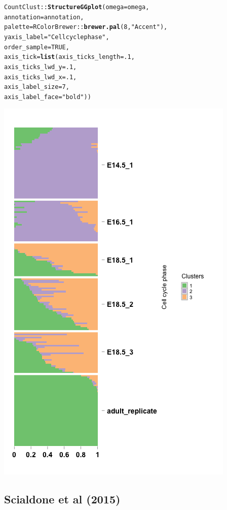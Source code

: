 \documentclass[12pt]{article}\usepackage[]{graphicx}\usepackage[usenames,dvipsnames]{color}
\makeatletter
\newcommand{\hlnum}[1]{\textcolor[rgb]{0.686,0.059,0.569}{#1}}%
\newcommand{\hlstr}[1]{\textcolor[rgb]{0.192,0.494,0.8}{#1}}%
\newcommand{\hlopt}[1]{\textcolor[rgb]{0,0,0}{#1}}%
\newcommand{\hlstd}[1]{\textcolor[rgb]{0.345,0.345,0.345}{#1}}%
\newcommand{\hlkwc}[1]{\textcolor[rgb]{0.333,0.667,0.333}{#1}}%
\newcommand{\hlkwd}[1]{\textcolor[rgb]{0.737,0.353,0.396}{\textbf{#1}}}%
\newenvironment{kframe}{%
 \def\at@end@of@kframe{}%
 \ifinner\ifhmode%
  \def\at@end@of@kframe{\end{minipage}}%
  \begin{minipage}{\columnwidth}%
 \fi\fi%
 \def\FrameCommand##1{\hskip\@totalleftmargin \hskip-\fboxsep
 \colorbox{shadecolor}{##1}\hskip-\fboxsep
     \hskip-\linewidth \hskip-\@totalleftmargin \hskip\columnwidth}%
 \MakeFramed {\advance\hsize-\width
   \@totalleftmargin\z@ \linewidth\hsize
   \@setminipage}}%
 {\par\unskip\endMakeFramed%
 \at@end@of@kframe}
\newenvironment{knitrout}{}{} %
\makeatother
\begin{document}
\begin{knitrout}
\begin{kframe}
\begin{alltt}
\hlstd{CountClust}\hlopt{::}\hlkwd{StructureGGplot}\hlstd{(}\hlkwc{omega} \hlstd{= omega,}
                \hlkwc{annotation} \hlstd{= annotation,}
                \hlkwc{palette} \hlstd{= RColorBrewer}\hlopt{::}\hlkwd{brewer.pal}\hlstd{(}\hlnum{8}\hlstd{,} \hlstr{"Accent"}\hlstd{),}
                \hlkwc{yaxis_label} \hlstd{=} \hlstr{"Cell cycle phase"}\hlstd{,}
                \hlkwc{order_sample} \hlstd{=} \hlnum{TRUE}\hlstd{,}
                \hlkwc{axis_tick} \hlstd{=} \hlkwd{list}\hlstd{(}\hlkwc{axis_ticks_length} \hlstd{=} \hlnum{.1}\hlstd{,}
                                 \hlkwc{axis_ticks_lwd_y} \hlstd{=} \hlnum{.1}\hlstd{,}
                                 \hlkwc{axis_ticks_lwd_x} \hlstd{=} \hlnum{.1}\hlstd{,}
                                 \hlkwc{axis_label_size} \hlstd{=} \hlnum{7}\hlstd{,}
                                 \hlkwc{axis_label_face} \hlstd{=} \hlstr{"bold"}\hlstd{))}
\end{alltt}
\end{kframe}
\includegraphics[width=3 in,height=5 in]{figure/structure_treutlin_classtpx_theta_fix_3-1} 

\end{knitrout}

\subsection{Scialdone et al (2015)}
\end{document}
